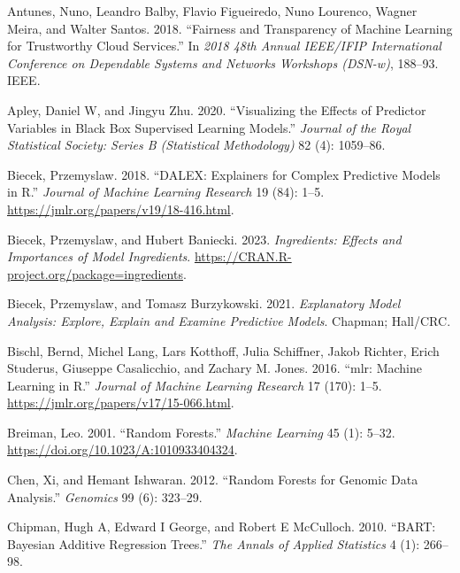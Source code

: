 \hypertarget{refs}{}
\begin{CSLReferences}{1}{0}
\leavevmode{}%
Antunes, Nuno, Leandro Balby, Flavio Figueiredo, Nuno Lourenco, Wagner Meira, and Walter Santos. 2018. {``Fairness and Transparency of Machine Learning for Trustworthy Cloud Services.''} In \emph{2018 48th Annual IEEE/IFIP International Conference on Dependable Systems and Networks Workshops (DSN-w)}, 188--93. IEEE.

\leavevmode{}%
Apley, Daniel W, and Jingyu Zhu. 2020. {``Visualizing the Effects of Predictor Variables in Black Box Supervised Learning Models.''} \emph{Journal of the Royal Statistical Society: Series B (Statistical Methodology)} 82 (4): 1059--86.

\leavevmode{}%
Biecek, Przemyslaw. 2018. {``DALEX: Explainers for Complex Predictive Models in {R}.''} \emph{Journal of Machine Learning Research} 19 (84): 1--5. \url{https://jmlr.org/papers/v19/18-416.html}.

\leavevmode{}%
Biecek, Przemyslaw, and Hubert Baniecki. 2023. \emph{Ingredients: Effects and Importances of Model Ingredients}. \url{https://CRAN.R-project.org/package=ingredients}.

\leavevmode{}%
Biecek, Przemyslaw, and Tomasz Burzykowski. 2021. \emph{Explanatory Model Analysis: Explore, Explain and Examine Predictive Models}. Chapman; Hall/CRC.

\leavevmode{}%
Bischl, Bernd, Michel Lang, Lars Kotthoff, Julia Schiffner, Jakob Richter, Erich Studerus, Giuseppe Casalicchio, and Zachary M. Jones. 2016. {``{mlr}: Machine Learning in {R}.''} \emph{Journal of Machine Learning Research} 17 (170): 1--5. \url{https://jmlr.org/papers/v17/15-066.html}.

\leavevmode{}%
Breiman, Leo. 2001. {``Random Forests.''} \emph{Machine Learning} 45 (1): 5--32. \url{https://doi.org/10.1023/A:1010933404324}.

\leavevmode{}%
Chen, Xi, and Hemant Ishwaran. 2012. {``Random Forests for Genomic Data Analysis.''} \emph{Genomics} 99 (6): 323--29.

\leavevmode{}%
Chipman, Hugh A, Edward I George, and Robert E McCulloch. 2010. {``BART: Bayesian Additive Regression Trees.''} \emph{The Annals of Applied Statistics} 4 (1): 266--98.


\end{CSLReferences}
